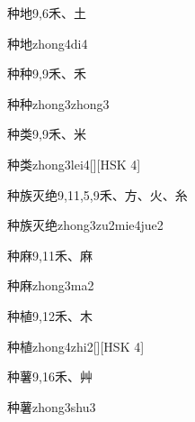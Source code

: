 \begin{entry}{种地}{9,6}{⽲、⼟}
  \begin{phonetics}{种地}{zhong4di4}
  \end{phonetics}
\end{entry}

\begin{entry}{种种}{9,9}{⽲、⽲}
  \begin{phonetics}{种种}{zhong3zhong3}
  \end{phonetics}
\end{entry}

\begin{entry}{种类}{9,9}{⽲、⽶}
  \begin{phonetics}{种类}{zhong3lei4}[][HSK 4]
  \end{phonetics}
\end{entry}

\begin{entry}{种族灭绝}{9,11,5,9}{⽲、⽅、⽕、⽷}
  \begin{phonetics}{种族灭绝}{zhong3zu2mie4jue2}
  \end{phonetics}
\end{entry}

\begin{entry}{种麻}{9,11}{⽲、⿇}
  \begin{phonetics}{种麻}{zhong3ma2}
  \end{phonetics}
\end{entry}

\begin{entry}{种植}{9,12}{⽲、⽊}
  \begin{phonetics}{种植}{zhong4zhi2}[][HSK 4]
  \end{phonetics}
\end{entry}

\begin{entry}{种薯}{9,16}{⽲、⾋}
  \begin{phonetics}{种薯}{zhong3shu3}
  \end{phonetics}
\end{entry}

